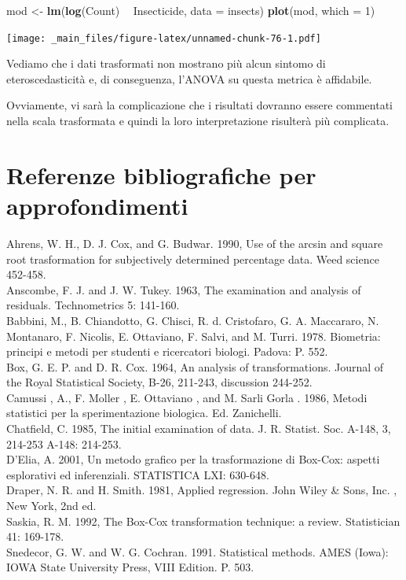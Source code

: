 \documentclass[a4paper,12pt,oneside]{book}
\newenvironment{Shaded}{\begin{snugshade}}{\end{snugshade}}
\newcommand{\KeywordTok}[1]{\textcolor[rgb]{0.13,0.29,0.53}{\textbf{#1}}}
\newcommand{\DataTypeTok}[1]{\textcolor[rgb]{0.13,0.29,0.53}{#1}}
\newcommand{\DecValTok}[1]{\textcolor[rgb]{0.00,0.00,0.81}{#1}}
\newcommand{\StringTok}[1]{\textcolor[rgb]{0.31,0.60,0.02}{#1}}
\newcommand{\OperatorTok}[1]{\textcolor[rgb]{0.81,0.36,0.00}{\textbf{#1}}}
\newcommand{\NormalTok}[1]{#1}
\theoremstyle{definition}
\theoremstyle{definition}
\theoremstyle{definition}
\theoremstyle{remark}
\begin{document}
\begin{Shaded}
\begin{Highlighting}[]
\NormalTok{mod <-}\StringTok{ }\KeywordTok{lm}\NormalTok{(}\KeywordTok{log}\NormalTok{(Count) }\OperatorTok{~}\StringTok{ }\NormalTok{Insecticide, }\DataTypeTok{data =}\NormalTok{ insects)}
\KeywordTok{plot}\NormalTok{(mod, }\DataTypeTok{which =} \DecValTok{1}\NormalTok{)}
\end{Highlighting}
\end{Shaded}

\texttt{[image: \_main\_files/figure-latex/unnamed-chunk-76-1.pdf]}

Vediamo che i dati trasformati non mostrano più alcun sintomo di
eteroscedasticità e, di conseguenza, l'ANOVA su questa metrica è
affidabile.

Ovviamente, vi sarà la complicazione che i risultati dovranno essere
commentati nella scala trasformata e quindi la loro interpretazione
risulterà più complicata.

\section{Referenze bibliografiche per
approfondimenti}\label{referenze-bibliografiche-per-approfondimenti}

Ahrens, W. H., D. J. Cox, and G. Budwar. 1990, Use of the arcsin and
square root trasformation for subjectively determined percentage data.
Weed science 452-458.\\
Anscombe, F. J. and J. W. Tukey. 1963, The examination and analysis of
residuals. Technometrics 5: 141-160.\\
Babbini, M., B. Chiandotto, G. Chisci, R. d. Cristofaro, G. A.
Maccararo, N. Montanaro, F. Nicolis, E. Ottaviano, F. Salvi, and M.
Turri. 1978. Biometria: principi e metodi per studenti e ricercatori
biologi. Padova: P. 552.\\
Box, G. E. P. and D. R. Cox. 1964, An analysis of transformations.
Journal of the Royal Statistical Society, B-26, 211-243, discussion
244-252.\\
Camussi , A., F. Moller , E. Ottaviano , and M. Sarli Gorla . 1986,
Metodi statistici per la sperimentazione biologica. Ed. Zanichelli.\\
Chatfield, C. 1985, The initial examination of data. J. R. Statist. Soc.
A-148, 3, 214-253 A-148: 214-253.\\
D'Elia, A. 2001, Un metodo grafico per la trasformazione di Box-Cox:
aspetti esplorativi ed inferenziali. STATISTICA LXI: 630-648.\\
Draper, N. R. and H. Smith. 1981, Applied regression. John Wiley \&
Sons, Inc. , New York, 2nd ed.\\
Saskia, R. M. 1992, The Box-Cox transformation technique: a review.
Statistician 41: 169-178.\\
Snedecor, G. W. and W. G. Cochran. 1991. Statistical methods. AMES
(Iowa): IOWA State University Press, VIII Edition. P. 503.\\
\end{document}

